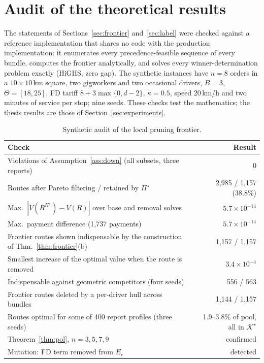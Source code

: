 \documentclass[review,12pt]{elsarticle}
\theoremstyle{definition}
\theoremstyle{remark}
\newcommand{\Kstar}{\mathcal{K}^\star}
\begin{document}
\section{Audit of the theoretical results}
\label{app:audit}

The statements of Sections~\ref{sec:frontier} and~\ref{sec:label} were
checked against a reference implementation that shares no code with the
production implementation: it enumerates every precedence-feasible sequence
of every bundle, computes the frontier analytically, and solves every
winner-determination problem exactly (HiGHS, zero gap). The synthetic
instances have $n=8$ orders in a $10\times10$\,km square, two gigworkers and
two occasional drivers, $B=3$, $\Theta=[18,25]$, FD tariff
$8+3\max\{0,d-2\}$, $\kappa=0.5$, speed 20\,km/h and two minutes of service
per stop; nine seeds. These checks test the mathematics; the thesis results
are those of Section~\ref{sec:experiments}.

\begin{table}[h]
\centering
\caption{Synthetic audit of the local pruning frontier.}
\label{tab:audit1}
\small
\begin{tabular}{lr}
\toprule
Check & Result\\
\midrule
Violations of Assumption~\ref{ass:down} (all subsets, three reports) & 0\\
Routes after Pareto filtering / retained by $\Pi^\star$ & 2,985 / 1,157 (38.8\%)\\
Max.\ $|V(R^{\Pi^\star})-V(R)|$ over base and removal solves & $5.7\times10^{-14}$\\
Max.\ payment difference (1,737 payments) & $5.7\times10^{-14}$\\
Frontier routes shown indispensable by the construction of Thm.~\ref{thm:frontier}(b) & 1,157 / 1,157\\
Smallest increase of the optimal value when the route is removed & $3.4\times10^{-4}$\\
Indispensable against geometric competitors (four seeds) & 556 / 563\\
Frontier routes deleted by a per-driver hull across bundles & 1,144 / 1,157\\
Routes optimal for some of 400 report profiles (three seeds) & 1.9--3.8\% of pool, all in $\Kstar$\\
Theorem~\ref{thm:pol}, $n=3,5,7,9$ & confirmed\\
Mutation: FD term removed from $E_r$ & detected\\
\bottomrule
\end{tabular}
\end{table}
\end{document}
